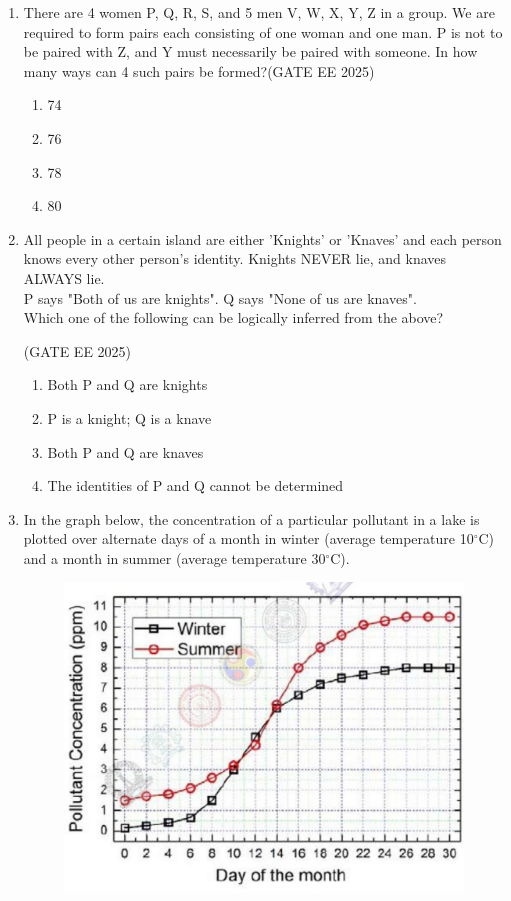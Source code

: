 \documentclass[journal,12pt,onecolumn]{IEEEtran}
\theoremstyle{remark}
\begin{document}
\begin{enumerate}
\item There are 4 women P, Q, R, S, and 5 men V, W, X, Y, Z in a group. We are required to form pairs each consisting of one woman and one man. P is not to be paired with Z, and Y must necessarily be paired with someone. In how many ways can 4 such pairs be formed?\hfill(GATE EE 2025)
\begin{multicols}{4}
\begin{enumerate}
\item 74
\item 76
\item 78
\item 80
\end{enumerate}
\end{multicols}

\item All people in a certain island are either 'Knights' or 'Knaves' and each person knows every other person's identity. Knights NEVER lie, and knaves ALWAYS lie. \\

P says "Both of us are knights". Q says "None of us are knaves".  \\

Which one of the following can be logically inferred from the above? 

\hfill(GATE EE 2025)

\begin{enumerate}
\item Both P and Q are knights
\item P is a knight; Q is a knave
\item Both P and Q are knaves
\item The identities of P and Q cannot be determined
\end{enumerate}


\item In the graph below, the concentration of a particular pollutant in a lake is plotted over alternate days of a month in winter (average temperature 10$^{\circ}$C) and a month in summer (average temperature 30$^{\circ}$C). 
\begin{figure}[h]
    \centering
    \includegraphics[width=0.5\columnwidth]{figs/fig1.jpg}
    \caption{}
    \label{fig:placeholder}
\end{figure}


\end{enumerate}
\end{document}
